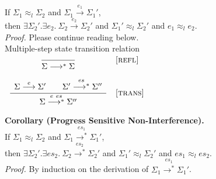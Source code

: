 \documentclass{article}
\makeatletter
\newcommand{\startrules}{\begin{array}{l@{~{,}~}lcl@{~{,}~}l|ll}}
\newcommand{\finishrules}{\end{array}}
\newcommand{\rn}[1]{\text{\textsc{[#1]}}}
\newcommand{\mrule}[3]{%
      \multicolumn{6}{c}{
        \dfrac{
          \begin{array}{c}
            #2
          \end{array}
        }{#3}
      }
    &
      \rn{#1}
  \\
      \multicolumn{7}{c}{}
  \\%
}
\newcommand{\ssteparrow}[1]{\overset{#1}{\longrightarrow}}
\newcommand{\ssteparrowstar}[1]{\overset{#1}{\longrightarrow^*}}
\newcommand{\sstep}[3]{#2\ssteparrow{#1}#3}
\newcommand{\sstepstar}[3]{#2\ssteparrowstar{#1}#3}
\newcommand{\lequiv}[3]{#2\approx_{#1}#3}
\makeatother
\begin{document}
If $\lequiv{l}{\Sigma_1}{\Sigma_2}$
and $\sstep{e_1}{\Sigma_1}{\Sigma_1'}$,
\\
then $\exists \Sigma_2'.\exists e_2.~\sstep{e_2}{\Sigma_2}{\Sigma_2'}$
and $\lequiv{l}{\Sigma_1'}{\Sigma_2'}$
and $\lequiv{l}{e_1}{e_2}$.
\\
\textit{Proof.}
Please continue reading below.
\\
\fbox{$\sstepstar{es}{\Sigma}{\Sigma}$} Multiple-step state transition relation
\\
$\startrules
  \mrule{refl}{
  }{
    \sstepstar{}{\Sigma}{\Sigma}
  }
  \mrule{trans}{
      \sstep{e}{\Sigma}{\Sigma'}
    \qquad
      \sstepstar{es}{\Sigma'}{\Sigma''}
  }{
    \sstepstar{e~es}{\Sigma}{\Sigma''}
  }
\finishrules$
\\
\textbf{Corollary (Progress Sensitive Non-Interference).}
\\
If $\lequiv{l}{\Sigma_1}{\Sigma_2}$
and $\sstepstar{es_1}{\Sigma_1}{\Sigma_1'}$,
\\
then $\exists \Sigma_2'.\exists es_2.~\sstepstar{es_2}{\Sigma_2}{\Sigma_2'}$
and $\lequiv{l}{\Sigma_1'}{\Sigma_2'}$
and $\lequiv{l}{es_1}{es_2}$.
\\
\textit{Proof.}
By induction on the derivation of $\sstepstar{es_1}{\Sigma_1}{\Sigma_1'}$.
\end{document}
